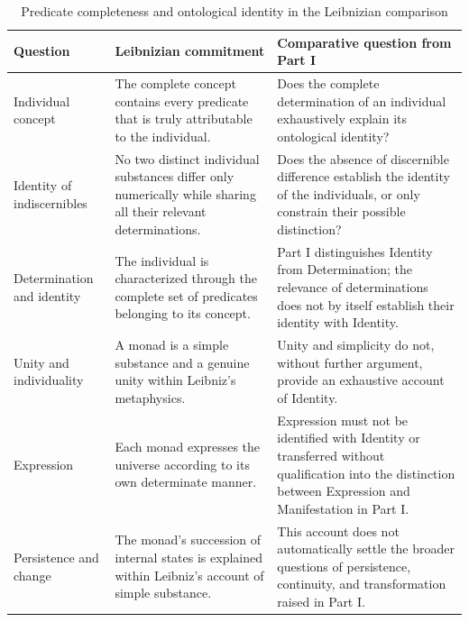 
\begin{table}[htbp]
\centering
\small
\caption{Predicate completeness and ontological identity in the Leibnizian comparison}
\label{tab:leibniz-predicate-completeness}
\renewcommand{\arraystretch}{1.2}
\begin{tabular}{|p{}|p{}|p{}|}
\hline
\textbf{Question} & \textbf{Leibnizian commitment} & \textbf{Comparative question from Part I} \\
\hline
Individual concept &
The complete concept contains every predicate that is truly attributable to the individual. &
Does the complete determination of an individual exhaustively explain its ontological identity? \\
\hline
Identity of indiscernibles &
No two distinct individual substances differ only numerically while sharing all their relevant determinations. &
Does the absence of discernible difference establish the identity of the individuals, or only constrain their possible distinction? \\
\hline
Determination and identity &
The individual is characterized through the complete set of predicates belonging to its concept. &
Part I distinguishes Identity from Determination; the relevance of determinations does not by itself establish their identity with Identity. \\
\hline
Unity and individuality &
A monad is a simple substance and a genuine unity within Leibniz's metaphysics. &
Unity and simplicity do not, without further argument, provide an exhaustive account of Identity. \\
\hline
Expression &
Each monad expresses the universe according to its own determinate manner. &
Expression must not be identified with Identity or transferred without qualification into the distinction between Expression and Manifestation in Part I. \\
\hline
Persistence and change &
The monad's succession of internal states is explained within Leibniz's account of simple substance. &
This account does not automatically settle the broader questions of persistence, continuity, and transformation raised in Part I. \\
\hline
\end{tabular}
\end{table}


